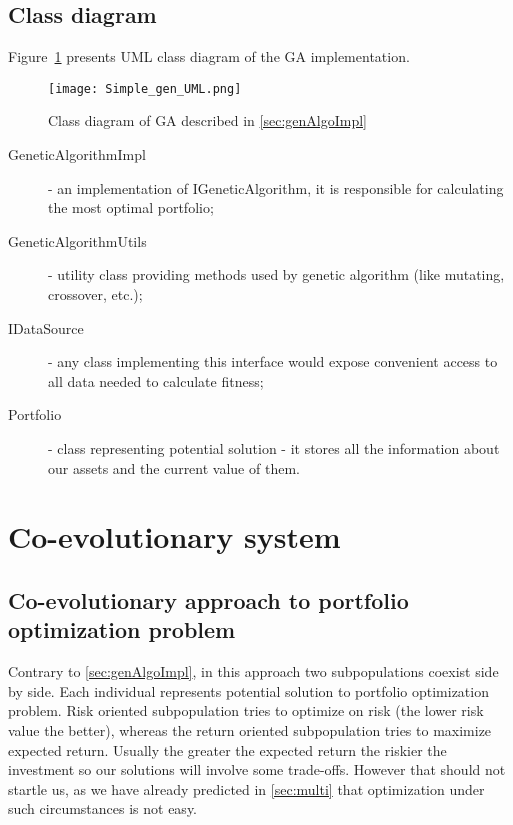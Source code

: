 \subsection{Class diagram}
\label{gen-class-diagram}

Figure~\ref{fig:GA_diag} presents UML class diagram of the GA implementation.

\begin{figure}[ht]   
	    \begin{center}
	      \texttt{[image: Simple\_gen\_UML.png]}
	    \end{center}
	    \caption{Class diagram of GA described in \ref{sec:genAlgoImpl}} 
	    \label{fig:GA_diag}
	  \end{figure}

\begin{description}
  \item [GeneticAlgorithmImpl]
    - an implementation of IGeneticAlgorithm, it is responsible for calculating the most optimal portfolio;
  \item [GeneticAlgorithmUtils]
    - utility class providing methods used by genetic algorithm (like mutating, crossover, etc.);
  \item [IDataSource]
    - any class implementing this interface would expose convenient access to all data needed to calculate fitness;
  \item [Portfolio]
    - class representing potential solution - it stores all the information about our assets and the current value of them.

\end{description}

\section{Co-evolutionary system}
\label{sec:co-evol-sys}

\subsection{Co-evolutionary approach to portfolio optimization problem}

Contrary to \ref{sec:genAlgoImpl}, in this approach two subpopulations coexist side by side.
Each individual represents potential solution to portfolio optimization problem.
Risk oriented subpopulation tries to optimize on risk (the lower risk value the better), whereas the return oriented subpopulation tries to maximize expected return.
Usually the greater the expected return the riskier the investment so our solutions will involve some trade-offs.
However that should not startle us, as we have already predicted in \ref{sec:multi} that optimization under such circumstances is not easy.

